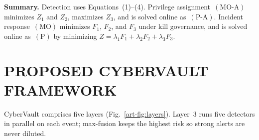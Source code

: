 \textbf{Summary.}
Detection uses Equations~(1)--(4). Privilege assignment~$(\mathrm{MO}\text{-}\mathrm{A})$ minimizes $Z_1$ and $Z_2$, maximizes $Z_3$, and is solved online as~$(\mathrm{P}\text{-}\mathrm{A})$. Incident response~$(\mathrm{MO})$ minimizes $F_1$, $F_2$, and $F_3$ under kill governance, and is solved online as~$(\mathrm{P})$ by minimizing $Z=\lambda_1 F_1+\lambda_2 F_2+\lambda_3 F_3$.

\section{PROPOSED CYBERVAULT FRAMEWORK}
\label{art-sec:framework}

CyberVault comprises five layers (Fig.~\ref{art-fig:layers}). Layer~3 runs five detectors in parallel on each event; max-fusion keeps the highest risk so strong alerts are never diluted.

